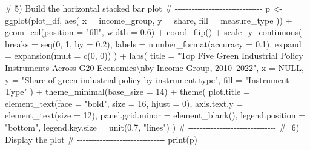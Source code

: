 \documentclass[
  letterpaper,
  DIV=11,
  numbers=noendperiod]{scrartcl}
\newenvironment{Shaded}{\begin{snugshade}}{\end{snugshade}}
\newcommand{\AttributeTok}[1]{\textcolor[rgb]{0.40,0.45,0.13}{#1}}
\newcommand{\CommentTok}[1]{\textcolor[rgb]{0.37,0.37,0.37}{#1}}
\newcommand{\ConstantTok}[1]{\textcolor[rgb]{0.56,0.35,0.01}{#1}}
\newcommand{\DecValTok}[1]{\textcolor[rgb]{0.68,0.00,0.00}{#1}}
\newcommand{\FloatTok}[1]{\textcolor[rgb]{0.68,0.00,0.00}{#1}}
\newcommand{\FunctionTok}[1]{\textcolor[rgb]{0.28,0.35,0.67}{#1}}
\newcommand{\NormalTok}[1]{\textcolor[rgb]{0.00,0.23,0.31}{#1}}
\newcommand{\OtherTok}[1]{\textcolor[rgb]{0.00,0.23,0.31}{#1}}
\newcommand{\SpecialCharTok}[1]{\textcolor[rgb]{0.37,0.37,0.37}{#1}}
\newcommand{\StringTok}[1]{\textcolor[rgb]{0.13,0.47,0.30}{#1}}
\begin{document}
\begin{Shaded}
\begin{Highlighting}[]
\CommentTok{\#  5) Build the horizontal stacked bar plot}
\CommentTok{\# {-}{-}{-}{-}{-}{-}{-}{-}{-}{-}{-}{-}{-}{-}{-}{-}{-}{-}{-}{-}{-}{-}{-}{-}{-}{-}{-}{-}{-}{-}{-}}
\NormalTok{p }\OtherTok{\textless{}{-}} \FunctionTok{ggplot}\NormalTok{(plot\_df, }\FunctionTok{aes}\NormalTok{(}
    \AttributeTok{x =}\NormalTok{ income\_group,}
    \AttributeTok{y =}\NormalTok{ share,}
    \AttributeTok{fill =}\NormalTok{ measure\_type}
\NormalTok{  )) }\SpecialCharTok{+}
  \FunctionTok{geom\_col}\NormalTok{(}\AttributeTok{position =} \StringTok{"fill"}\NormalTok{, }\AttributeTok{width =} \FloatTok{0.6}\NormalTok{) }\SpecialCharTok{+}
  \FunctionTok{coord\_flip}\NormalTok{() }\SpecialCharTok{+}
  \FunctionTok{scale\_y\_continuous}\NormalTok{(}
    \AttributeTok{breaks =} \FunctionTok{seq}\NormalTok{(}\DecValTok{0}\NormalTok{, }\DecValTok{1}\NormalTok{, }\AttributeTok{by =} \FloatTok{0.2}\NormalTok{),}
    \AttributeTok{labels =} \FunctionTok{number\_format}\NormalTok{(}\AttributeTok{accuracy =} \FloatTok{0.1}\NormalTok{),}
    \AttributeTok{expand =} \FunctionTok{expansion}\NormalTok{(}\AttributeTok{mult =} \FunctionTok{c}\NormalTok{(}\DecValTok{0}\NormalTok{, }\DecValTok{0}\NormalTok{))}
\NormalTok{  ) }\SpecialCharTok{+}
  \FunctionTok{labs}\NormalTok{(}
    \AttributeTok{title =} \StringTok{"Top Five Green Industrial Policy Instruments Across G20 Economies}\SpecialCharTok{\textbackslash{}n}\StringTok{by Income Group, 2010–2022"}\NormalTok{,}
    \AttributeTok{x =} \ConstantTok{NULL}\NormalTok{,}
    \AttributeTok{y =} \StringTok{"Share of green industrial policy by instrument type"}\NormalTok{,}
    \AttributeTok{fill =} \StringTok{"Instrument Type"}
\NormalTok{  ) }\SpecialCharTok{+}
  \FunctionTok{theme\_minimal}\NormalTok{(}\AttributeTok{base\_size =} \DecValTok{14}\NormalTok{) }\SpecialCharTok{+}
  \FunctionTok{theme}\NormalTok{(}
    \AttributeTok{plot.title      =} \FunctionTok{element\_text}\NormalTok{(}\AttributeTok{face =} \StringTok{"bold"}\NormalTok{, }\AttributeTok{size =} \DecValTok{16}\NormalTok{, }\AttributeTok{hjust =} \DecValTok{0}\NormalTok{),}
    \AttributeTok{axis.text.y     =} \FunctionTok{element\_text}\NormalTok{(}\AttributeTok{size =} \DecValTok{12}\NormalTok{),}
    \AttributeTok{panel.grid.minor =} \FunctionTok{element\_blank}\NormalTok{(),}
    \AttributeTok{legend.position =} \StringTok{"bottom"}\NormalTok{,}
    \AttributeTok{legend.key.size =} \FunctionTok{unit}\NormalTok{(}\FloatTok{0.7}\NormalTok{, }\StringTok{"lines"}\NormalTok{)}
\NormalTok{  )}
\CommentTok{\# {-}{-}{-}{-}{-}{-}{-}{-}{-}{-}{-}{-}{-}{-}{-}{-}{-}{-}{-}{-}{-}{-}{-}{-}{-}{-}{-}{-}{-}{-}{-}}
\CommentTok{\# ️ 6) Display the plot}
\CommentTok{\# {-}{-}{-}{-}{-}{-}{-}{-}{-}{-}{-}{-}{-}{-}{-}{-}{-}{-}{-}{-}{-}{-}{-}{-}{-}{-}{-}{-}{-}{-}{-}}
\FunctionTok{print}\NormalTok{(p)}
\end{Highlighting}
\end{Shaded}
\end{document}
